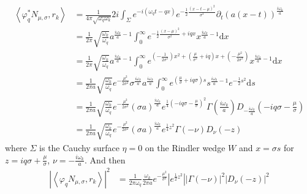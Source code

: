 \documentclass[12pt,a4paper]{article}
\newcommand{\dv}[1]{\mathrm{d} #1 \text{ }}
\begin{document}
\begin{equation}
  \begin{aligned}
    \left< \varphi_q^* N_{\mu,\sigma}, r_k\right> &= \frac{1}{4\pi \sqrt{\omega_q \omega_k}} 2i \int_\Sigma e^{-i(\omega_q t - q x)} e^{-\frac{1}{2} \frac{(x-t-\mu)^2}{\sigma^2}} \partial_t (a(x-t))^\frac{i\omega_k}{a} \\
    &= \frac{1}{2\pi} \sqrt{\frac{\omega_k}{\omega_q}} a^{\frac{i \omega_k}{a} - 1} \int_0^\infty e^{-\frac{1}{2} \frac{(x-\mu)^2}{\sigma^2} + i q x} x^{\frac{i\omega_k}{a} - 1} \dv{x} \\
    &= \frac{1}{2\pi} \sqrt{\frac{\omega_k}{\omega_q}} a^{\frac{i \omega_k}{a} - 1} \int_0^\infty e^{\left(-\frac{1}{2\sigma^2}\right) x^2 + \left(\frac{\mu}{\sigma^2} + i q \right) x + \left( -\frac{\mu^2}{2\sigma^2}\right)} x^{\frac{i\omega_k}{a} - 1} \dv{x} \\
    &= \frac{1}{2\pi a} \sqrt{\frac{\omega_k}{\omega_q}} e^{-\frac{\mu^2}{2 \sigma^2}} \sigma^{\frac{i\omega_k}{a}} a^{\frac{i \omega_k}{a} }  \int_0^\infty e^{(\frac{\mu}{\sigma} + i q \sigma)s} s^{\frac{i\omega_k}{a} - 1} e^{-\frac{1}{2} s^2} \dv{s}\\
    &= \frac{1}{2\pi a} \sqrt{\frac{\omega_k}{\omega_q}} e^{-\frac{\mu^2}{2 \sigma^2}} {(\sigma a)}^{\frac{i \omega_k}{a}} e^{\frac{1}{4}(-i q \sigma - \frac{\mu}{\sigma})^2} \Gamma\left(\frac{i\omega_k}{a}\right) D_{-\frac{i\omega_k}{a}}(-i q\sigma - \frac{\mu}{\sigma}) \\
    &=  \frac{1}{2\pi a } \sqrt{\frac{\omega_k}{\omega_q}} e^{-\frac{\mu^2}{2 \sigma^2}}  (\sigma a)^\frac{i\omega_k}{a} e^{\frac{1}{4} z^2} \Gamma(-\nu) D_\nu(-z)
  \end{aligned}
\end{equation}
where $\Sigma$ is the Cauchy surface $\eta=0$ on the Rindler wedge $W$ and $x = \sigma s$ for $z = i q \sigma + \frac{\mu}{\sigma}$, $\nu = -\frac{i \omega_k}{a}$. And then
\begin{equation}
  \begin{aligned}
    \left|\left< \varphi_q N_{\mu,\sigma}, r_k \right>\right|^2 &= \frac{1}{2\pi\omega_q} \frac{\omega_k}{2\pi a} e^{-\frac{\mu^2}{\sigma^2}} \left| e^{\frac{1}{2} z^2} \right| \left| \Gamma(-\nu) \right|^2 \left| D_\nu(-z) \right|^2 \\
  \end{aligned}
\label{pcf}
\end{equation}
\end{document}
